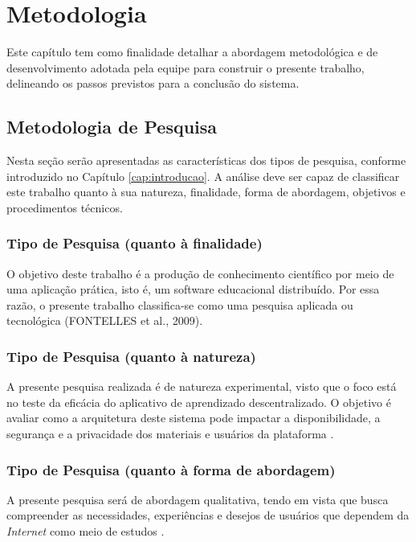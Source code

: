 \chapter[Metodologia]{Metodologia}
\label{cap:metodologia}

Este capítulo tem como finalidade detalhar a abordagem metodológica e de desenvolvimento adotada pela equipe para construir o presente trabalho, delineando os passos previstos para a conclusão do sistema.

\section{Metodologia de Pesquisa}

Nesta seção serão apresentadas as características dos tipos de pesquisa, conforme introduzido no Capítulo \ref{cap:introducao}. A análise deve ser capaz de classificar este trabalho quanto à sua natureza, finalidade, forma de abordagem, objetivos e procedimentos técnicos.

\subsection{Tipo de Pesquisa (quanto à finalidade)}
O objetivo deste trabalho é a produção de conhecimento científico por meio de uma aplicação prática, isto é, um software educacional distribuído. Por essa razão, o presente trabalho classifica-se como uma pesquisa aplicada ou tecnológica (FONTELLES et al., 2009).

\subsection{Tipo de Pesquisa (quanto à natureza)}
A presente pesquisa realizada é de natureza experimental, visto que o foco está no teste da eficácia do aplicativo de aprendizado descentralizado. O objetivo é avaliar como a arquitetura deste sistema pode impactar a disponibilidade, a segurança e a privacidade dos materiais e usuários da plataforma \cite{fontelles2009}.

\subsection{Tipo de Pesquisa (quanto à forma de abordagem)}
A presente pesquisa será de abordagem qualitativa, tendo em vista que busca compreender as necessidades, experiências e desejos de usuários que dependem da \textit{Internet} como meio de estudos \cite{fontelles2009}.

